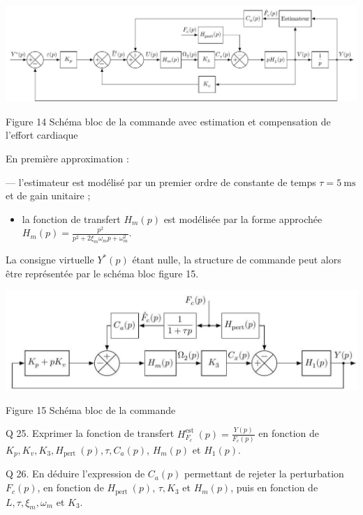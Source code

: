 \documentclass[10pt]{article}
\begin{document}
\begin{center}
\includegraphics[max width=\textwidth]{2023_07_26_54f5e859400a10e656ddg-09(1)}
\end{center}

Figure 14 Schéma bloc de la commande avec estimation et compensation de l'effort cardiaque

En première approximation :

— l'estimateur est modélisé par un premier ordre de constante de temps $\tau=5 \mathrm{~ms}$ et de gain unitaire ;

\begin{itemize}
  \item la fonction de transfert $H_{m}(p)$ est modélisée par la forme approchée $H_{m}(p)=\frac{p^{2}}{p^{2}+2 \xi_{m} \omega_{m} p+\omega_{m}^{2}}$.
\end{itemize}

La consigne virtuelle $Y^{*}(p)$ étant nulle, la structure de commande peut alors être représentée par le schéma bloc figure 15.

\begin{center}
\includegraphics[max width=\textwidth]{2023_07_26_54f5e859400a10e656ddg-09}
\end{center}

Figure 15 Schéma bloc de la commande

Q 25. Exprimer la fonction de transfert $H_{F_{c}}^{\text {est }}(p)=\frac{Y(p)}{F_{c}(p)}$ en fonction de $K_{p}, K_{v}, K_{3}, H_{\text {pert }}(p), \tau, C_{a}(p)$, $H_{m}(p)$ et $H_{1}(p)$.

Q 26. En déduire l'expression de $C_{a}(p)$ permettant de rejeter la perturbation $F_{c}(p)$, en fonction de $H_{\text {pert }}(p)$, $\tau, K_{3}$ et $H_{m}(p)$, puis en fonction de $L, \tau, \xi_{m}, \omega_{m}$ et $K_{3}$.
\end{document}
